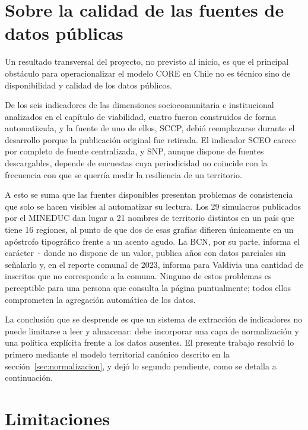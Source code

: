 \documentclass[12pt,letterpaper,oneside]{report}
\begin{document}
\section{Sobre la calidad de las fuentes de datos p\'ublicas}
\label{sec:calidad-fuentes}

Un resultado transversal del proyecto, no previsto al inicio, es que el principal obst\'aculo para operacionalizar el modelo CORE en Chile no es t\'ecnico sino de disponibilidad y calidad de los datos p\'ublicos.

De los seis indicadores de las dimensiones sociocomunitaria e institucional analizados en el cap\'itulo de viabilidad, cuatro fueron construidos de forma automatizada, y la fuente de uno de ellos, SCCP, debi\'o reemplazarse durante el desarrollo porque la publicaci\'on original fue retirada. El indicador SCEO carece por completo de fuente centralizada, y SNP, aunque dispone de fuentes descargables, depende de encuestas cuya periodicidad no coincide con la frecuencia con que se querr\'ia medir la resiliencia de un territorio.

A esto se suma que las fuentes disponibles presentan problemas de consistencia que solo se hacen visibles al automatizar su lectura. Los 29 simulacros publicados por el MINEDUC dan lugar a 21 nombres de territorio distintos en un pa\'is que tiene 16 regiones, al punto de que dos de esas graf\'ias difieren \'unicamente en un ap\'ostrofo tipogr\'afico frente a un acento agudo. La BCN, por su parte, informa el car\'acter \texttt{-} donde no dispone de un valor, publica a\~nos con datos parciales sin se\~nalarlo y, en el reporte comunal de 2023, informa para Valdivia una cantidad de inscritos que no corresponde a la comuna. Ninguno de estos problemas es perceptible para una persona que consulta la p\'agina puntualmente; todos ellos comprometen la agregaci\'on autom\'atica de los datos.

La conclusi\'on que se desprende es que un sistema de extracci\'on de indicadores no puede limitarse a leer y almacenar: debe incorporar una capa de normalizaci\'on y una pol\'itica expl\'icita frente a los datos ausentes. El presente trabajo resolvi\'o lo primero mediante el modelo territorial can\'onico descrito en la secci\'on~\ref{sec:normalizacion}, y dej\'o lo segundo pendiente, como se detalla a continuaci\'on.

\section{Limitaciones}
\label{sec:limitaciones}
\end{document}
